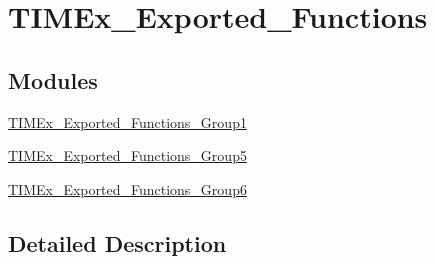 \hypertarget{group___t_i_m_ex___exported___functions}{}\section{T\+I\+M\+Ex\+\_\+\+Exported\+\_\+\+Functions}
\label{group___t_i_m_ex___exported___functions}
\subsection*{Modules}
\begin{DoxyCompactItemize}
\item 
\hyperlink{group___t_i_m_ex___exported___functions___group1}{T\+I\+M\+Ex\+\_\+\+Exported\+\_\+\+Functions\+\_\+\+Group1}
\item 
\hyperlink{group___t_i_m_ex___exported___functions___group5}{T\+I\+M\+Ex\+\_\+\+Exported\+\_\+\+Functions\+\_\+\+Group5}
\item 
\hyperlink{group___t_i_m_ex___exported___functions___group6}{T\+I\+M\+Ex\+\_\+\+Exported\+\_\+\+Functions\+\_\+\+Group6}
\end{DoxyCompactItemize}


\subsection{Detailed Description}
